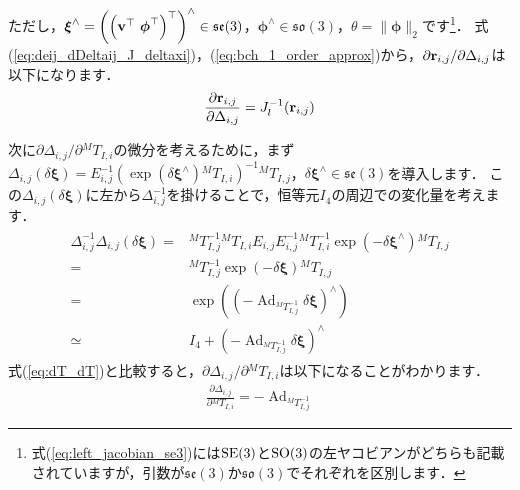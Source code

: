 %
ただし，$\boldsymbol \xi^{\wedge} = \left( \left( {\bf v}^{\top} ~ \boldsymbol \phi^{\top} \right)^{\top} \right)^{\wedge} \in \mathfrak{se}(3) $，$\boldsymbol \phi^{\wedge} \in \mathfrak{so}(3)$，$\theta = \| \boldsymbol \phi \|_{2}$です\footnote{式(\ref{eq:left_jacobian_se3})には${\rm SE}(3)$と${\rm SO(3)}$の左ヤコビアンがどちらも記載されていますが，引数が$\mathfrak{se}(3)$か$\mathfrak{so}(3)$でそれぞれを区別します．}．
式(\ref{eq:deij_dDeltaij_J_deltaxi})，(\ref{eq:bch_1_order_approx})から，$\partial {\bf r}_{i, j} / \partial \Delta_{i, j}$は以下になります．
%
\begin{align}
  \frac{ \partial {\bf r}_{i, j} }{ \partial \Delta_{i, j} } = J_{l}^{-1}( {\bf r}_{i, j} )
  \label{eq:deij_dDeltaij}
\end{align}
%

次に$\partial \Delta_{i, j} / \partial {}^{M}T_{I, i}$の微分を考えるために，まず$\Delta_{i, j} \left( \delta \boldsymbol \xi \right) = E_{i, j}^{-1} \left( \exp \left( \delta \boldsymbol \xi^{\wedge} \right) {}^{M}T_{I, i} \right)^{-1} {}^{M}T_{I, j}$，$\delta \boldsymbol \xi^{\wedge} \in \mathfrak{se}(3)$を導入します．
この$\Delta_{i, j} \left( \delta \boldsymbol \xi \right)$に左から$\Delta_{i, j}^{-1}$を掛けることで，恒等元$I_{4}$の周辺での変化量を考えます．
%
\begin{align}
  \begin{split}
    \Delta_{i, j}^{-1} \Delta_{i, j} \left( \delta \boldsymbol \xi \right)
%
    = & {}^{M}T_{I, j}^{-1} {}^{M}T_{I, i} E_{i, j} E_{i, j}^{-1} {}^{M}T_{I, i}^{-1} \exp \left( -\delta \boldsymbol \xi^{\wedge} \right) {}^{M}T_{I, j} \\
%
    = & {}^{M}T_{I, j}^{-1} \exp \left( -\delta \boldsymbol \xi \right) {}^{M}T_{I, j} \\
%
    = & \exp \left( \left( -\operatorname{Ad}_{ {}^{M}T_{I, j}^{-1} } \delta \boldsymbol \xi \right)^{\wedge} \right) \\
    \simeq & I_{4} + \left( -\operatorname{Ad}_{ {}^{M}T_{I, j}^{-1} } \delta \boldsymbol \xi \right)^{\wedge}
%
  \end{split}
\end{align}
%
式(\ref{eq:dT_dT})と比較すると，$\partial \Delta_{i, j} / \partial {}^{M}T_{I, i}$は以下になることがわかります．
%
\begin{align}
  \frac{ \partial \Delta_{i, j} }{ \partial {}^{M}T_{I, i} } = - \operatorname{Ad}_{ {}^{M}T_{I, j}^{-1} }
  \label{eq:dDeltaij_dTi}
\end{align}
%

